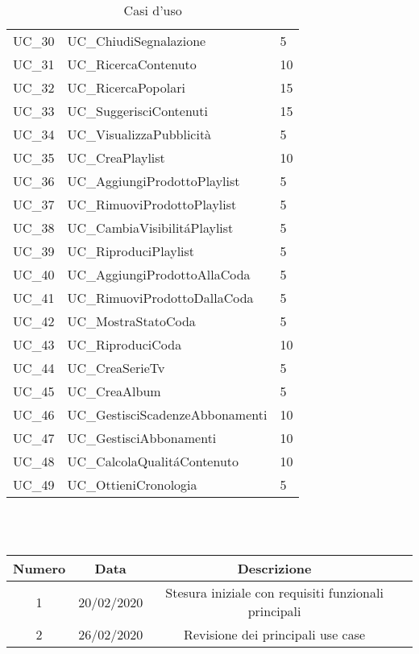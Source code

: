 \begin{table}[hb]
\begin{tabular}{ |P{3.5cm}|P{5cm}|P{3.5cm}|  }
UC\_30 & UC\_ChiudiSegnalazione & 5\\
UC\_31 & UC\_RicercaContenuto & 10\\
UC\_32 & UC\_RicercaPopolari & 15\\
UC\_33 & UC\_SuggerisciContenuti & 15\\
UC\_34 & UC\_VisualizzaPubblicità & 5\\
UC\_35 & UC\_CreaPlaylist & 10\\
UC\_36 & UC\_AggiungiProdottoPlaylist & 5\\
UC\_37 & UC\_RimuoviProdottoPlaylist & 5\\
UC\_38 & UC\_CambiaVisibilitáPlaylist & 5\\
UC\_39 & UC\_RiproduciPlaylist & 5\\
UC\_40 & UC\_AggiungiProdottoAllaCoda & 5\\
UC\_41 & UC\_RimuoviProdottoDallaCoda & 5\\
UC\_42 & UC\_MostraStatoCoda & 5\\
UC\_43 & UC\_RiproduciCoda & 10\\
UC\_44 & UC\_CreaSerieTv & 5\\
UC\_45 & UC\_CreaAlbum & 5\\
UC\_46 & UC\_GestisciScadenzeAbbonamenti & 10\\
UC\_47 & UC\_GestisciAbbonamenti & 10\\
UC\_48 & UC\_CalcolaQualitáContenuto & 10\\
UC\_49 & UC\_OttieniCronologia & 5\\
\end{tabular}
\caption{Casi d'uso}
\end{table}

\begin{table}[b]
 \\ \\
\begin{tabular}{|c | c | c | c|} 
 	\hline
	 Numero & Data & Descrizione \\ [0.5ex] 
	\hline\hline
	1 & 20/02/2020 & Stesura iniziale con requisiti funzionali principali \\
	\hline
	2 & 26/02/2020 & Revisione dei principali use case\\
	\hline
\end{tabular}
\end{table}